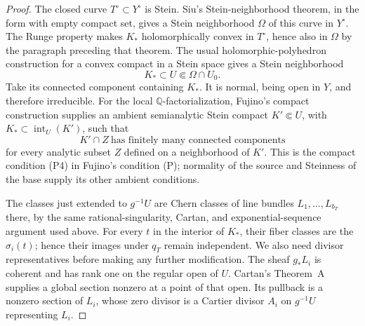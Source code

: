 \documentclass[11pt]{amsart}
\theoremstyle{definition}
\theoremstyle{remark}
\numberwithin{equation}{section}
\newcommand{\Q}{\mathbb{Q}}
\begin{document}
\begin{proof}
The closed curve \(T^\circ\subset Y^\circ\) is Stein.  Siu's
Stein-neighborhood theorem, in the form
\cite[Theorem~2.1]{ForstnericStein} with empty compact set, gives a
Stein neighborhood \(\Omega\) of this curve in \(Y^\circ\).
The Runge property makes \(K_*\) holomorphically convex in
\(T^\circ\), hence also in \(\Omega\) by the paragraph preceding
that theorem.  The usual holomorphic-polyhedron construction for a
convex compact in a Stein space gives a Stein neighborhood
\[
 K_*\subset U\Subset\Omega\cap U_0.
\]
Take its connected component containing \(K_*\).  It is normal,
being open in \(Y\), and therefore irreducible.  For the local
\(\Q\)-factorialization, Fujino's compact construction
\cite[Section~1.11]{FujinoAnalyticMMP} supplies an ambient semianalytic
Stein compact \(K'\Subset U\), with
\(K_*\subset\operatorname{int}_U(K')\), such that
\[
 K'\cap Z\ \text{has finitely many connected components}
\]
for every analytic subset \(Z\) defined on a neighborhood of
\(K'\).  This is the compact condition (P4) in Fujino's condition
(P); normality of the source and Steinness of the base supply its
other ambient conditions.

The classes just extended to \(g^{-1}U\) are Chern classes of line
bundles \(L_1,\ldots,L_{b_T}\) there, by the same rational-singularity,
Cartan, and exponential-sequence argument used above.  For every
\(t\) in the interior of \(K_*\), their fiber classes are the
\(\sigma_i(t)\); hence their images under \(q_T\) remain independent.
We also need divisor representatives before making any further
modification.  The sheaf \(g_*L_i\) is coherent and has rank one on
the regular open of \(U\).  Cartan's Theorem~A supplies a global
section nonzero at a point of that open.  Its pullback is a nonzero
section of \(L_i\), whose zero divisor is a Cartier divisor \(A_i\)
on \(g^{-1}U\) representing \(L_i\).


\end{proof}
\end{document}
